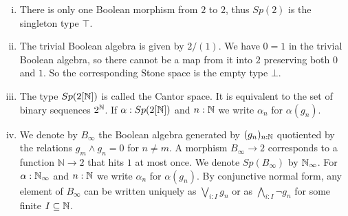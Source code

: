 \begin{example}
  \label{boolean-algebra-examples}
  \item 
  \begin{enumerate}[(i)]
  \item There is only one Boolean morphism from $2$ to $2$, thus $Sp(2)$ is the singleton type $\top$. 
  \item   
    The trivial Boolean algebra is given by $2/(1)$. 
    We have $0=1$ in the trivial Boolean algebra, so  
    there cannot be a map from it into $2$ preserving both $0$ and $1$.
    So the corresponding Stone space is the empty type $\bot$.
  \item\label{ExampleBAunderCantor}   
    The type $Sp(2[\mathbb{N}])$ is called the Cantor space. It is equivalent to the set of binary sequences $2^{\mathbb{N}}$. 
    If $\alpha:Sp(2[\mathbb{N}])$ and $n:\mathbb{N}$ we write $\alpha_n $ for $\alpha(g_n)$. 
  \item\label{ExampleBAunderNinfty}
    We denote by $B_\infty$ the Boolean algebra generated by 
    $(g_n)_{n:\mathbb{N}}$ quotiented by the relations $g_m \wedge g_n = 0$ for ${n\neq m}$.
    A morphism $B_\infty\to 2$ corresponds to a function 
    $\mathbb N \to 2$ that hits $1$ at most once. 
    We denote $Sp(B_\infty)$ by $\mathbb{N}_{\infty}$. 
    For $\alpha:\mathbb{N}_{\infty}$ and $n:\mathbb{N}$ we write $\alpha_n$ for $\alpha(g_n)$. 
  By conjunctive normal form, 
  any element of $B_\infty$ can be written uniquely as 
  $\bigvee_{i:I} g_n$ or as $\bigwedge_{i:I} \neg g_n$ for some finite $I\subseteq \mathbb{N}$. 
  \end{enumerate}
\end{example}

